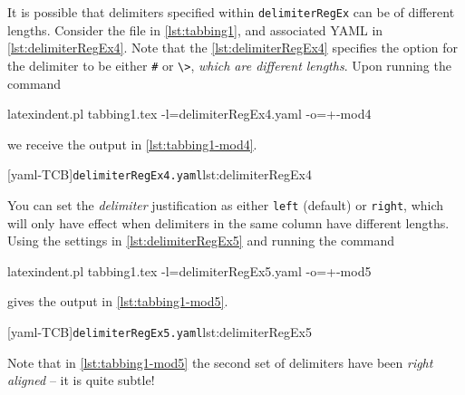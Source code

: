  \begin{example}
 It is possible that delimiters specified within \texttt{delimiterRegEx} can be of
 different lengths. Consider the file in \cref{lst:tabbing1}, and associated YAML in
 \cref{lst:delimiterRegEx4}. Note that the \cref{lst:delimiterRegEx4} specifies the
 option for the delimiter to be either \lstinline!#! or \lstinline!\>!, \emph{which are
 different lengths}. Upon running the command 

 \begin{commandshell}
latexindent.pl tabbing1.tex -l=delimiterRegEx4.yaml -o=+-mod4
\end{commandshell}

 we receive the output in \cref{lst:tabbing1-mod4}. 

 \begin{cmhtcbraster}[raster columns=3,
   raster left skip=-3.5cm,
   raster right skip=-2cm,
   raster column skip=.03\linewidth]
  [yaml-TCB]{\texttt{delimiterRegEx4.yaml}}{lst:delimiterRegEx4}
 \end{cmhtcbraster}
 \end{example}

 \begin{example}
 You can set the \emph{delimiter} justification as either \texttt{left} (default) or
 \texttt{right}, which will only have effect when delimiters in the same column have
 different lengths. Using the settings in \cref{lst:delimiterRegEx5} and running the
 command  

 \begin{commandshell}
latexindent.pl tabbing1.tex -l=delimiterRegEx5.yaml -o=+-mod5
\end{commandshell}

 gives the output in \cref{lst:tabbing1-mod5}. 

 \begin{cmhtcbraster}
  [yaml-TCB]{\texttt{delimiterRegEx5.yaml}}{lst:delimiterRegEx5}
 \end{cmhtcbraster}

 Note that in \cref{lst:tabbing1-mod5} the second set of delimiters have been \emph{right
 aligned} -- it is quite subtle!
 \end{example}

